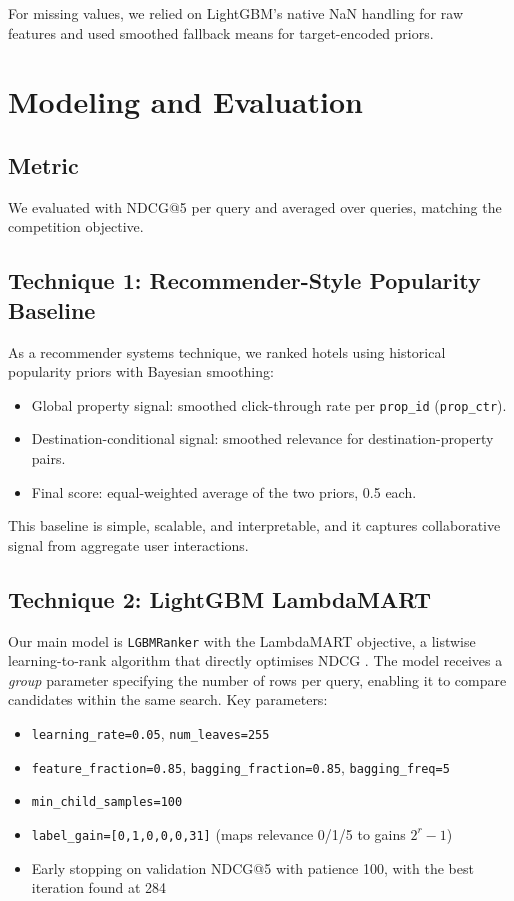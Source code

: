 \documentclass{llncs}
\begin{document}
For missing values, we relied on LightGBM's native NaN handling for raw features and used smoothed fallback means for target-encoded priors.

\section{Modeling and Evaluation}
\label{sec:model}

\subsection{Metric}
We evaluated with NDCG@5 per query and averaged over queries, matching the competition objective.

\subsection{Technique 1: Recommender-Style Popularity Baseline}
As a recommender systems technique, we ranked hotels using historical popularity priors with Bayesian smoothing:
\begin{itemize}
\item Global property signal: smoothed click-through rate per \texttt{prop\_id} (\texttt{prop\_ctr}).
\item Destination-conditional signal: smoothed relevance for destination-property pairs.
\item Final score: equal-weighted average of the two priors, 0.5 each.
\end{itemize}

This baseline is simple, scalable, and interpretable, and it captures collaborative signal from aggregate user interactions.

\subsection{Technique 2: LightGBM LambdaMART}
Our main model is \texttt{LGBMRanker} with the LambdaMART objective, a listwise learning-to-rank algorithm that directly optimises NDCG \cite{burges2010ranknet}. The model receives a \emph{group} parameter specifying the number of rows per query, enabling it to compare candidates within the same search. Key parameters:
\begin{itemize}
\item \texttt{learning\_rate=0.05}, \texttt{num\_leaves=255}
\item \texttt{feature\_fraction=0.85}, \texttt{bagging\_fraction=0.85}, \texttt{bagging\_freq=5}
\item \texttt{min\_child\_samples=100}
\item \texttt{label\_gain=[0,1,0,0,0,31]} (maps relevance 0/1/5 to gains $2^r-1$)
\item Early stopping on validation NDCG@5 with patience 100, with the best iteration found at 284
\end{itemize}
\end{document}
